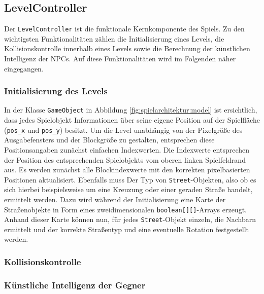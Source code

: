 \subsection{LevelController}

Der \texttt{LevelController} ist die funktionale Kernkomponente des Spiels.
Zu den wichtigsten Funktionalitäten zählen die Initialisierung eines Levels, die Kollisionskontrolle innerhalb eines Levels sowie die Berechnung der künstlichen Intelligenz der NPCs.
Auf diese Funktionalitäten wird im Folgenden näher eingegangen.

\subsubsection{Initialisierung des Levels}
In der Klasse \texttt{GameObject} in Abbildung \ref{fig:spielarchitektur:model} ist ersichtlich, dass jedes Spielobjekt Informationen über seine eigene Position auf der Spielfläche (\texttt{pos\_x} und \texttt{pos\_y}) besitzt.
Um die Level unabhängig von der Pixelgröße des Ausgabefensters und der Blockgröße zu gestalten, entsprechen diese Positionsangaben zunächst einfachen Indexwerten.
Die Indexwerte entsprechen der Position des entsprechenden Spielobjekts vom oberen linken Spielfeldrand aus.
Es werden zunächst alle Blockindexwerte mit den korrekten pixelbasierten Positionen aktualisiert.
Ebenfalls muss Der Typ von \texttt{Street}-Objekten, also ob es sich hierbei beispielsweise um eine Kreuzung oder einer geraden Straße handelt, ermittelt werden.
Dazu wird während der Initialisierung eine Karte der Straßenobjekte in Form eines zweidimensionalen \texttt{boolean[][]}-Arrays erzeugt.
Anhand dieser Karte können nun, für jedes \texttt{Street}-Objekt einzeln, die Nachbarn ermittelt und der korrekte Straßentyp und eine eventuelle Rotation festgestellt werden.

\subsubsection{Kollisionskontrolle}

\subsubsection{Künstliche Intelligenz der Gegner}
